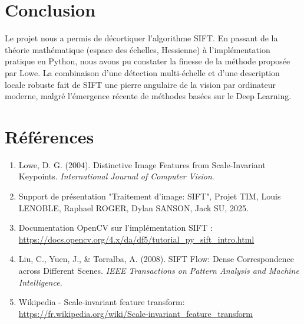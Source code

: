 \documentclass[a4paper,12pt]{report}
\begin{document}
\chapter{Conclusion}
Le projet nous a permis de décortiquer l'algorithme SIFT. En passant de la théorie mathématique (espace des échelles, Hessienne) à l'implémentation pratique en Python, nous avons pu constater la finesse de la méthode proposée par Lowe. La combinaison d'une détection multi-échelle et d'une description locale robuste fait de SIFT une pierre angulaire de la vision par ordinateur moderne, malgré l'émergence récente de méthodes basées sur le Deep Learning.

\appendix
\chapter{Références}
\begin{enumerate}
    \item Lowe, D. G. (2004). Distinctive Image Features from Scale-Invariant Keypoints. \textit{International Journal of Computer Vision}.
    \item Support de présentation "Traitement d'image: SIFT", Projet TIM, Louis LENOBLE, Raphael ROGER, Dylan SANSON, Jack SU, 2025.
    \item Documentation OpenCV sur l'implémentation SIFT : \url{https://docs.opencv.org/4.x/da/df5/tutorial_py_sift_intro.html}
    \item Liu, C., Yuen, J., & Torralba, A. (2008). SIFT Flow: Dense Correspondence across Different Scenes. \textit{IEEE Transactions on Pattern Analysis and Machine Intelligence}.
    \item Wikipedia - Scale-invariant feature transform: \url{https://fr.wikipedia.org/wiki/Scale-invariant_feature_transform}
\end{enumerate}
\end{document}
